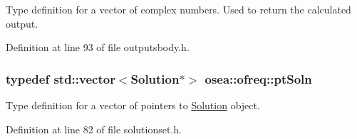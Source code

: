 Type definition for a vector of complex numbers. Used to return the calculated output. 



Definition at line 93 of file outputsbody.\-h.

\hypertarget{namespaceosea_1_1ofreq_a951464fca478bccfc9e5295910e5eec3}{
\subsubsection[{pt\-Soln}]{\setlength{\rightskip}{0pt plus 5cm}typedef std\-::vector$<${\bf Solution}$\ast$$>$ {\bf osea\-::ofreq\-::pt\-Soln}}}\label{namespaceosea_1_1ofreq_a951464fca478bccfc9e5295910e5eec3}
Type definition for a vector of pointers to \hyperlink{classosea_1_1ofreq_1_1_solution}{Solution} object. 

Definition at line 82 of file solutionset.\-h.

